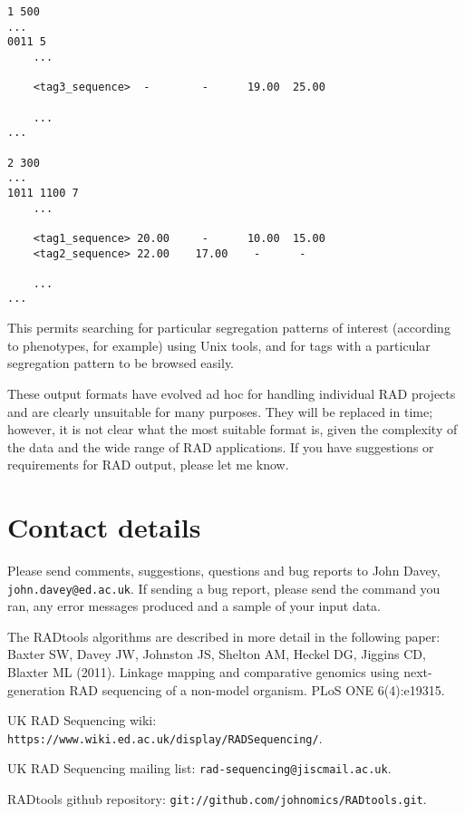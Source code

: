 \documentclass[a4paper]{article}
\begin{document}
\begin{verbatim}
1 500
...
0011 5
    ...

    <tag3_sequence>  -        -      19.00  25.00

    ...
...

2 300
...
1011 1100 7
    ...

    <tag1_sequence> 20.00     -      10.00  15.00
    <tag2_sequence> 22.00    17.00    -      -

    ...
...
\end{verbatim}

This permits searching for particular segregation patterns of interest (according to phenotypes, for example) using Unix tools, and for tags with a particular segregation pattern to be browsed easily.

These output formats have evolved ad hoc for handling individual RAD projects and are clearly unsuitable for many purposes. They will be replaced in time; however, it is not clear what the most suitable format is, given the complexity of the data and the wide range of RAD applications. If you have suggestions or requirements for RAD output, please let me know.


\section{Contact details}

Please send comments, suggestions, questions and bug reports to John Davey, \verb|john.davey@ed.ac.uk|. If sending a bug report, please send the command you ran, any error messages produced and a sample of your input data.

The RADtools algorithms are described in more detail in the following paper:
Baxter SW, Davey JW, Johnston JS, Shelton AM, Heckel DG, Jiggins CD, Blaxter ML (2011). Linkage mapping and comparative genomics using next-generation RAD sequencing of a non-model organism. PLoS ONE 6(4):e19315.

UK RAD Sequencing wiki: \verb|https://www.wiki.ed.ac.uk/display/RADSequencing/|.

UK RAD Sequencing mailing list: \verb|rad-sequencing@jiscmail.ac.uk|.

RADtools github repository: \verb|git://github.com/johnomics/RADtools.git|.
\end{document}
